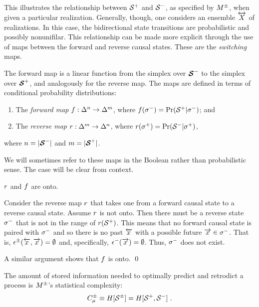 This illustrates the relationship between ${\mathcal{S}}^{+}$ and
${\mathcal{S}}^{-}$, as specified by ${M}^{\pm}$, when given a particular
realization. Generally, though, one considers an ensemble $\overleftrightarrow {{X}}$ of
realizations. In this case, the bidirectional state transitions are
probabilistic and possibly nonunifilar. This relationship can be made more
explicit through the use of maps between the forward and reverse causal states.
These are the \emph{switching} maps.

The forward map is a linear function from the simplex over ${\boldsymbol{\mathcal{S}}}^{-}$
to the simplex over ${\boldsymbol{\mathcal{S}}}^{+}$, and analogously for the reverse
map. The maps are defined in terms of conditional probability distributions:
\begin{enumerate}
\item The \emph{forward map} $f: \Delta^n \rightarrow \Delta^m$, where
$f(\sigma^{-}) = \Pr({\mathcal{S}}^{+} | \sigma^{-})$;
and
\item The \emph{reverse map} $r: \Delta^m \rightarrow \Delta^n$,
where
$r(\sigma^{+}) = \Pr({\mathcal{S}}^{-} | \sigma^{+})$,
\end{enumerate}
where $n = |{\boldsymbol{\mathcal{S}}}^{-}|$ and $m = |{\boldsymbol{\mathcal{S}}}^{+}|$.

We will sometimes refer to these maps in the Boolean rather than probabilistic
sense. The case will be clear from context.

\begin{Prop}
$r$ and $f$ are onto.
\label{SwitchingMapsAreOnto}
\end{Prop}

\begin{ProProp}
Consider the reverse map $r$ that takes one from a forward causal
state to a reverse causal state. Assume $r$ is not onto. 
Then there must be a reverse state $\sigma^{-}$
that is not in the range of $r({\mathcal{S}}^{+})$. This means that no forward
causal state is paired with $\sigma^{-}$ and so there is no past ${\overleftarrow {{x}}}$
with a possible future $\overrightarrow{{x}} \in \sigma^{-}$. That is,
$\epsilon^{\pm}({\overleftarrow {{x}}},\overrightarrow{{x}}) = \emptyset$ and, specifically,
$\epsilon^{-}(\overrightarrow{{x}}) = \emptyset$.
Thus, $\sigma^{-}$ does not exist.

A similar argument shows that $f$ is onto.
\qed
\end{ProProp}

\begin{Def}
The amount of stored information needed to optimally predict and retrodict
a process is ${M}^{\pm}$'s statistical complexity:
\begin{equation}
C_\mu^{\pm} \equiv H[{\mathcal{S}}^{\pm}] = H[{\mathcal{S}}^{+},{\mathcal{S}}^{-}] ~.
\end{equation}
\end{Def}

